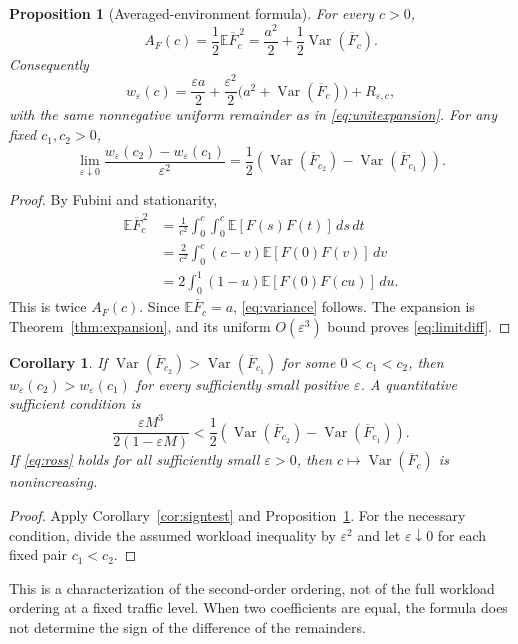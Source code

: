 \documentclass[aap,preprint]{imsart}
\numberwithin{equation}{section}
\theoremstyle{plain}
\newtheorem{proposition}[theorem]{Proposition}
\newtheorem{corollary}[theorem]{Corollary}
\theoremstyle{definition}
\newcommand{\E}{\mathbb E}
\newcommand{\1}{\mathbf 1}
\newcommand{\eps}{\varepsilon}
\DeclareMathOperator{\Var}{Var}
\begin{document}
\begin{proposition}[Averaged-environment formula]\label{prop:variance}
For every $c>0$,
\begin{equation}\label{eq:variance}
 A_F(c)=\frac12\E\overline F_c^{\,2}
       =\frac{a^2}{2}+\frac12\Var(\overline F_c).
\end{equation}
Consequently
\begin{equation}\label{eq:varianceexpansion}
 w_\eps(c)=\frac{\eps a}{2}
 +\frac{\eps^2}{2}\bigl(a^2+\Var(\overline F_c)\bigr)+R_{\eps,c},
\end{equation}
with the same nonnegative uniform remainder as in \eqref{eq:unitexpansion}. For any fixed $c_1,c_2>0$,
\begin{equation}\label{eq:limitdiff}
 \lim_{\eps\downarrow0}
 \frac{w_\eps(c_2)-w_\eps(c_1)}{\eps^2}
 =\frac12\left(\Var(\overline F_{c_2})-\Var(\overline F_{c_1})\right).
\end{equation}
\end{proposition}
\begin{proof}
By Fubini and stationarity,
\begin{align*}
 \E\overline F_c^{\,2}
 &=\frac1{c^2}\int_0^c\int_0^c\E[F(s)F(t)]\,ds\,dt\\
 &=\frac2{c^2}\int_0^c(c-v)\E[F(0)F(v)]\,dv\\
 &=2\int_0^1(1-u)\E[F(0)F(cu)]\,du.
\end{align*}
This is twice $A_F(c)$. Since $\E\overline F_c=a$, \eqref{eq:variance} follows. The expansion is Theorem~\ref{thm:expansion}, and its uniform $O(\eps^3)$ bound proves \eqref{eq:limitdiff}.
\end{proof}

\begin{corollary}\label{cor:variancecriterion}
If $\Var(\overline F_{c_2})>\Var(\overline F_{c_1})$ for some $0<c_1<c_2$, then $w_\eps(c_2)>w_\eps(c_1)$ for every sufficiently small positive $\eps$. A quantitative sufficient condition is
\begin{equation}\label{eq:varianceeps}
 \frac{\eps M^3}{2(1-\eps M)}
 <\frac12\left(\Var(\overline F_{c_2})-\Var(\overline F_{c_1})\right).
\end{equation}
If \eqref{eq:ross} holds for all sufficiently small $\eps>0$, then $c\mapsto\Var(\overline F_c)$ is nonincreasing.
\end{corollary}
\begin{proof}
Apply Corollary~\ref{cor:signtest} and Proposition~\ref{prop:variance}. For the necessary condition, divide the assumed workload inequality by $\eps^2$ and let $\eps\downarrow0$ for each fixed pair $c_1<c_2$.
\end{proof}
This is a characterization of the second-order ordering, not of the full workload ordering at a fixed traffic level. When two coefficients are equal, the formula does not determine the sign of the difference of the remainders.
\end{document}
